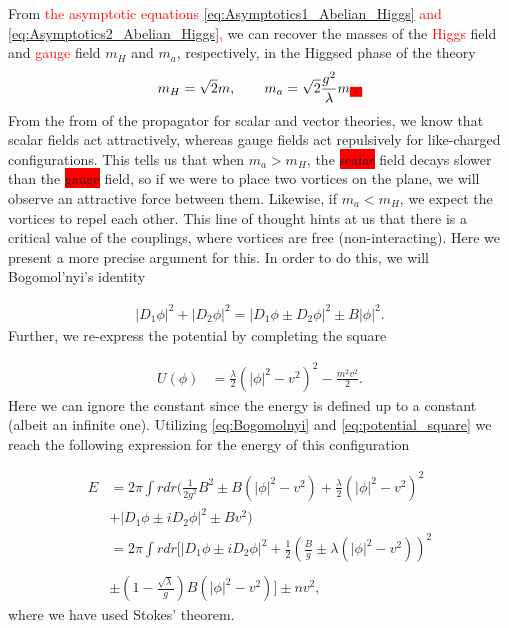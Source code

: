     From \textcolor{red}{the asymptotic equations \eqref{eq:Asymptotics1_Abelian_Higgs} and \eqref{eq:Asymptotics2_Abelian_Higgs},} we can recover the masses of the \textcolor{red}{Higgs} field and \textcolor{red}{gauge} field $m_{H}$ and $m_a$, respectively, in the Higgsed phase of the theory\colorbox{red}{ } 
    \begin{align}
        m_{H}= \sqrt{2} m, \qquad m_a = \sqrt{2} \frac{g^2}{\lambda}m \colorbox{red}{.}
    \end{align}
    From the from of the propagator for scalar and vector theories, we know that scalar fields act attractively, whereas gauge fields act repulsively for like-charged configurations. This tells us that when $m_a>m_H$, the \colorbox{red}{scalar} field decays slower than the \colorbox{red}{gauge} field, so if we were to place two vortices on the plane, we will observe an attractive force between them. Likewise, if  $m_a<m_H$, we expect the vortices to repel each other. This line of thought hints at us that there is a critical value of the couplings, where vortices are free (non-interacting). Here we present a more precise argument for this. In order to do this, we will Bogomol'nyi's identity\colorbox{red}{ }

    \begin{align}
        |D_1 \phi|^2 + |D_2 \phi|^2 = |D_1 \phi \pm D_2 \phi|^2 \pm B |\phi|^2. \label{eq:Bogomolnyi}
    \end{align}
    Further, we re-express the potential by completing the square\colorbox{red}{ }

    \begin{align}
        U(\phi)&=\frac{\lambda}{2} \left( |\phi|^2 - v^2 \right)^2 - \frac{m^2 v^2}{2}. \label{eq:potential_square}
    \end{align}
    Here we can ignore the constant since the energy is defined up to a constant (albeit an infinite one). Utilizing \eqref{eq:Bogomolnyi} and \eqref{eq:potential_square} we reach the following expression for the energy of this configuration

    \begin{align}
        E &= 2 \pi \int r dr \bigg(\frac{1}{2 g^2}B^2 \pm B(|\phi|^2 -v^2) + \frac{\lambda}{2} \left(|\phi|^2 -v^2 \right)^2 \\ \nonumber 
        &+ |D_1\phi \pm i D_2 \phi|^2 \pm B v^2 \bigg) \\ \nonumber
        &= 2 \pi \int r dr \bigg[|D_1\phi \pm i D_2 \phi|^2 +\frac{1}{2}\left( \frac{B}{g} \pm \lambda \left(|\phi|^2 -v^2  \right) \right)^2   \\ \nonumber \\
        &\pm \left(1 - \frac{\sqrt{\lambda}}{g} \right) B \left(|\phi|^2 - v^2 \right) \bigg] \pm n v^2,
    \end{align}
    where we have used Stokes' theorem.

